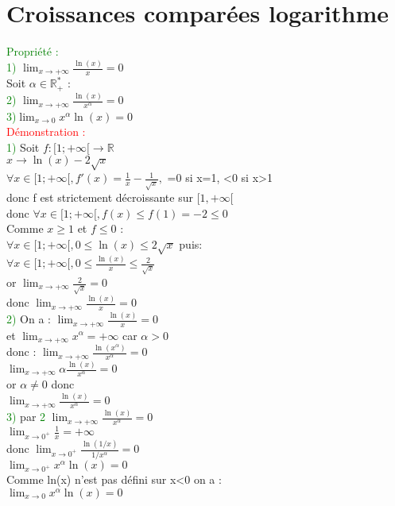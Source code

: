 \documentclass{article}
\begin{document}
 \section{Croissances comparées  logarithme}
 \textcolor{green}{Propriété :} \\
 \textcolor{green}{1)} $\lim_{x \rightarrow + \infty} \frac{\ln(x)}{x}=0$ \\
 Soit $\alpha \in \mathbb{R}^*_+$ : \\
 \textcolor{green}{2)} $\lim_{x \rightarrow + \infty} \frac{\ln(x)}{x^\alpha}=0$ \\
 \textcolor{green}{3)}$\lim_{x \rightarrow 0} x^\alpha \ln(x) =0$ \\
 \textcolor{red}{Démonstration :} \\
 \textcolor{green}{1)} Soit $f :[1;+\infty [ \rightarrow \mathbb{R}$ \\
 \indent $x \rightarrow \ln(x)-2\sqrt{x}$ \\
 $\forall x \in [1;+\infty[, f'(x)=\frac{1}{x}-\frac{1}{\sqrt{x}},$ =0 si x=1, <0 si x>1 \\
 donc f est strictement décroissante sur $[1,+\infty[$ \\
 donc $\forall x \in [1; +\infty[,f(x)\leq f(1)=-2 \leq 0$ \\
 Comme $x\geq 1$ et $f \leq 0$ : \\
 $\forall x \in [1;+ \infty[, 0 \leq \ln(x) \leq 2 \sqrt{x}$
 puis: \\
 $\forall x \in [1 ; +\infty [,0 \leq \frac{\ln(x)}{x} \leq \frac{2}{\sqrt{x}}$ \\
 or $\lim_{x \rightarrow + \infty} \frac{2}{\sqrt{x}}=0$ \\
 donc $\lim_{x \rightarrow + \infty} \frac{\ln(x)}{x}=0$ \\
 \textcolor{green}{2)} On a : $\lim_{x \rightarrow +\infty} \frac{\ln(x)}{x}=0$ \\
 et $\lim_{x \rightarrow +\infty} x^\alpha = +\infty$ car $\alpha > 0$ \\
 donc : $\lim_{x \rightarrow + \infty} \frac{\ln(x^\alpha)}{x^\alpha}=0$ \\
 $\lim_{x \rightarrow + \infty} \alpha \frac{\ln(x)}{x^\alpha}=0$ \\
 or $ \alpha \neq 0$ donc \\
 $\lim_{x \rightarrow +\infty} \frac{\ln(x)}{x^\alpha}=0$ \\
 \textcolor{green}{3)} par \textcolor{green}{2} $\lim_{x \rightarrow + \infty} \frac{\ln(x)}{x^\alpha}=0$ \\
 $\lim_{x \rightarrow 0^+} \frac{1}{x}=+ \infty$ \\
 donc $\lim_{x \rightarrow 0^+}\frac{\ln(1/x)}{1/x^\alpha}=0$ \\
 $\lim_{x \rightarrow 0^+} x^\alpha \ln(x) =0$ \\
 Comme ln(x) n'est pas défini sur x<0  on a : \\
 $\lim_{x \rightarrow 0} x^\alpha \ln(x) =0$
\end{document}
